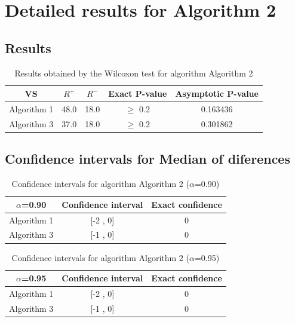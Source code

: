 \documentclass[a4paper,10pt]{article}
\begin{document}
 \clearpage 


\section{Detailed results for Algorithm 2}


\subsection{Results}

\begin{table}[!htp]
\centering\small
\begin{tabular}{
|c|c|c|c|c|}
\hline
 VS & $R^{+}$ & $R^{-}$ & Exact P-value & Asymptotic P-value \\ \hline 
Algorithm 1 & 48.0 & 18.0 & $\geq$ 0.2 & 0.163436\\ \hline 
Algorithm 3 & 37.0 & 18.0 & $\geq$ 0.2 & 0.301862\\ \hline 

\end{tabular}
\caption{Results obtained by the Wilcoxon test for algorithm Algorithm 2}
\end{table}

\subsection{Confidence intervals for Median of diferences}

\begin{table}[!htp]
\centering\small
\begin{tabular}{
|c|c|c|}
\hline
 $\alpha$=0.90 & Confidence interval & Exact confidence \\ \hline 
Algorithm 1 & [-2 , 0] & 0\\ \hline 
Algorithm 3 & [-1 , 0] & 0\\ \hline 

\end{tabular}
\caption{Confidence intervals for algorithm Algorithm 2 ($\alpha$=0.90)}
\end{table}
\begin{table}[!htp]
\centering\small
\begin{tabular}{
|c|c|c|}
\hline
 $\alpha$=0.95 & Confidence interval & Exact confidence \\ \hline 
Algorithm 1 & [-2 , 0] & 0\\ \hline 
Algorithm 3 & [-1 , 0] & 0\\ \hline 

\end{tabular}
\caption{Confidence intervals for algorithm Algorithm 2 ($\alpha$=0.95)}
\end{table}
\end{document}
